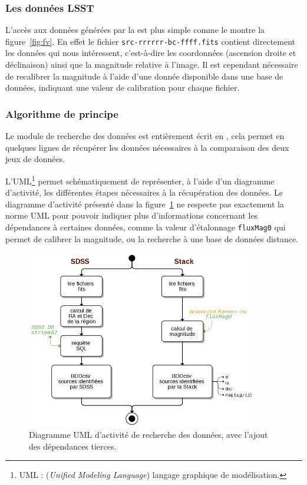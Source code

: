 		\subsubsection{Les données LSST}

L'accès aux données générées par la \stack{} est plus simple comme le montre la figure~\ref{fig:fv}. En effet le fichier \texttt{src-rrrrrr-bc-ffff.fits} contient directement les données qui nous intéressent, c'est-à-dire les coordonnées (ascension droite et déclinaison) ainsi que la magnitude relative à l'image. Il est cependant nécessaire de recalibrer la magnitude à l'aide d'une donnée disponible dans une base de données, indiquant une valeur de calibration pour chaque fichier.




		\subsubsection{Algorithme de principe}

Le module de recherche des données est entièrement écrit en \Python{}, cela permet en quelques lignes de récupérer les données nécessaires à la comparaison des deux jeux de données.

L'UML\footnote{UML : (\emph{Unified Modeling Language}) langage graphique de modélisation.} permet schématiquement de représenter, à l'aide d'un diagramme d'activité, les différentes étapes nécessaires à la récupération des données. Le diagramme d'activité présenté dans la figure~\ref{fig:dia-data} ne respecte pas exactement la norme UML pour pouvoir indiquer plus d'informations concernant les dépendances à certaines données, comme la valeur d'étalonnage \texttt{fluxMag0} qui permet de calibrer la magnitude, ou la recherche à une base de données distance.
\begin{figure}[h]
	\centering
	\includegraphics[width=0.9\textwidth]{img/dia-data.png}
	\caption[Diagramme UML d'activité de recherche des données]{Diagramme UML d'activité de recherche des données, avec l'ajout des dépendances tierces.}
	\label{fig:dia-data}
\end{figure}


